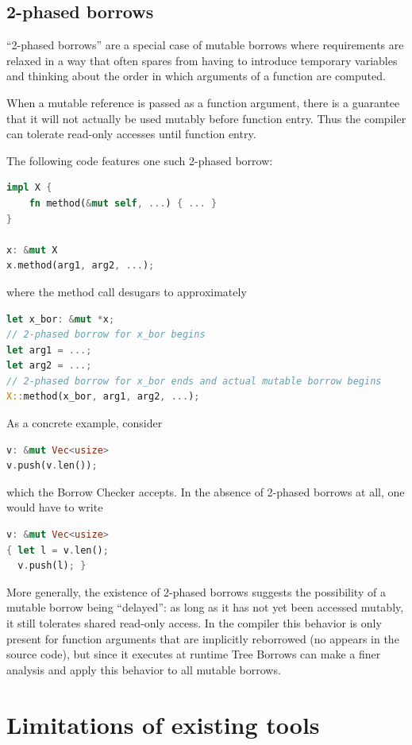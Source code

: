 \documentclass[a4paper,11pt]{article}
\theoremstyle{plain}
\theoremstyle{definition}
\theoremstyle{remark}
\newcommand{\tcode}[1]{\rstinline{#1}}
\begin{document}
\subsection{2-phased borrows}

``2-phased borrows'' are a special case of mutable borrows where requirements
are relaxed in a way that often spares from having to introduce temporary variables
and thinking about the order in which arguments of a function are computed.

When a mutable reference is passed as a function argument, there is a guarantee
that it will not actually be used mutably before function entry. Thus the compiler
can tolerate read-only accesses until function entry.

The following code features one such 2-phased borrow:
\begin{lstlisting}[language=rust]
impl X {
    fn method(&mut self, ...) { ... }
}

x: &mut X
x.method(arg1, arg2, ...);
\end{lstlisting}
where the method call desugars to approximately
\begin{lstlisting}[language=rust]
let x_bor: &mut *x;
// 2-phased borrow for x_bor begins
let arg1 = ...;
let arg2 = ...;
// 2-phased borrow for x_bor ends and actual mutable borrow begins
X::method(x_bor, arg1, arg2, ...);
\end{lstlisting}

As a concrete example, consider
\begin{lstlisting}[language=rust]
v: &mut Vec<usize>
v.push(v.len());
\end{lstlisting}
which the Borrow Checker accepts.
In the absence of 2-phased borrows at all, one would have to write
\begin{lstlisting}[language=rust]
v: &mut Vec<usize>
{ let l = v.len();
  v.push(l); }
\end{lstlisting}

More generally, the existence of 2-phased borrows suggests the possibility of a mutable
borrow being ``delayed'': as long as it has not yet been accessed mutably, it still
tolerates shared read-only access.
In the compiler this behavior is only present for function arguments that are
implicitly reborrowed (no \tcode{\&mut} appears in the source code), but since it
executes at runtime Tree Borrows can make a finer analysis and apply this behavior
to all mutable borrows.


\section{Limitations of existing tools}
\end{document}
